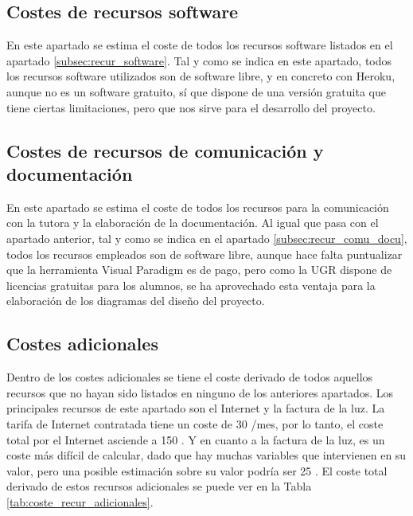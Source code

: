 \subsection{Costes de recursos software}

En este apartado se estima el coste de todos los recursos software listados en el apartado \ref{subsec:recur_software}. Tal y como se indica en este apartado, todos los recursos software utilizados son de software libre, y en concreto con Heroku, aunque no es un software gratuito, sí que dispone de una versión gratuita que tiene ciertas limitaciones, pero que nos sirve para el desarrollo del proyecto.

\subsection{Costes de recursos de comunicación y documentación}

En este apartado se estima el coste de todos los recursos para la comunicación con la tutora y la elaboración de la documentación. Al igual que pasa con el apartado anterior, tal y como se indica en el apartado \ref{subsec:recur_comu_docu}, todos los recursos empleados son de software libre, aunque hace falta puntualizar que la herramienta Visual Paradigm es de pago, pero como la UGR dispone de licencias gratuitas para los alumnos, se ha aprovechado esta ventaja para la elaboración de los diagramas del diseño del proyecto.

\subsection{Costes adicionales}

Dentro de los costes adicionales se tiene el coste derivado de todos aquellos recursos que no hayan sido listados en ninguno de los anteriores apartados. Los principales recursos de este apartado son el Internet y la factura de la luz. La tarifa de Internet contratada tiene un coste de 30 \EURtm/mes, por lo tanto, el coste total por el Internet asciende a 150 \EURtm. Y en cuanto a la factura de la luz, es un coste más difícil de calcular, dado que hay muchas variables que intervienen en su valor, pero una posible estimación sobre su valor podría ser 25 \EURtm. El coste total derivado de estos recursos adicionales se puede ver en la Tabla \ref{tab:coste_recur_adicionales}.

\begin{table}[h]
\centering
{}
\caption{Costes asociados a los recursos adicionales}
\label{tab:coste_recur_adicionales}
\end{table}



